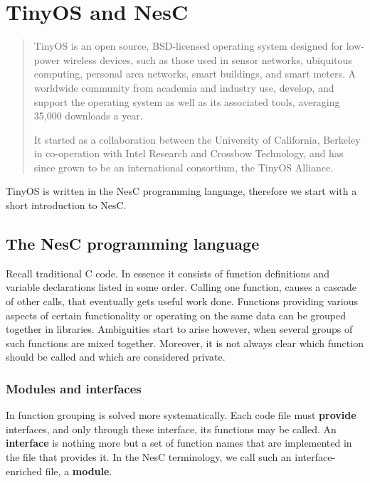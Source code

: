 \chapter{TinyOS and NesC}
\label{ch:tos_and_nesc}

\begin{quotation}
TinyOS is an open source, BSD-licensed operating system designed for low-power wireless devices, such as those used in sensor networks, ubiquitous computing, personal area networks, smart buildings, and smart meters. A worldwide community from academia and industry use, develop, and support the operating system as well as its associated tools, averaging 35,000 downloads a year.

It started as a collaboration between the University of California, Berkeley in co-operation with Intel Research and Crossbow Technology, and has since grown to be an international consortium, the TinyOS Alliance.

{\hfill \cite{TOSnet,TOSw}}
\end{quotation}

TinyOS is written in the NesC programming language, therefore we start with a short introduction to NesC.

\section{The NesC programming language}

Recall traditional C code. In essence it consists of function definitions and variable declarations listed in some order. Calling one function, causes a cascade of other calls, that eventually gets useful work done. Functions providing various aspects of certain functionality or operating on the same data can be grouped together in libraries. Ambiguities start to arise however, when several groups of such functions are mixed together. Moreover, it is not always clear which function should be called and which are considered private.

\subsection{Modules and interfaces}

In \cite{NesC} function grouping is solved more systematically. Each code file must {\bf provide} interfaces, and only through these interface, its functions may be called. An {\bf interface} is nothing more but a set of function names that are implemented in the file that provides it. In the NesC terminology, we call such an interface-enriched file, a {\bf module}.

